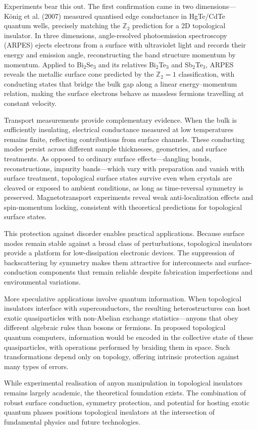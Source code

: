 Experiments bear this out. The first confirmation came in two dimensions—König et al. (2007) measured quantised edge conductance in HgTe/CdTe quantum wells, precisely matching the $\mathbb{Z}_2$ prediction for a 2D topological insulator. In three dimensions, angle-resolved photoemission spectroscopy (ARPES) ejects electrons from a surface with ultraviolet light and records their energy and emission angle, reconstructing the band structure momentum by momentum. Applied to Bi\(_2\)Se\(_3\) and its relatives Bi\(_2\)Te\(_3\) and Sb\(_2\)Te\(_3\), ARPES reveals the metallic surface cone predicted by the $\mathbb{Z}_2 = 1$ classification, with conducting states that bridge the bulk gap along a linear energy–momentum relation, making the surface electrons behave as massless fermions travelling at constant velocity.

Transport measurements provide complementary evidence. When the bulk is sufficiently insulating, electrical conductance measured at low temperatures remains finite, reflecting contributions from surface channels. These conducting modes persist across different sample thicknesses, geometries, and surface treatments. As opposed to ordinary surface effects—dangling bonds, reconstructions, impurity bands—which vary with preparation and vanish with surface treatment, topological surface states survive even when crystals are cleaved or exposed to ambient conditions, as long as time-reversal symmetry is preserved. Magnetotransport experiments reveal weak anti-localization effects and spin-momentum locking, consistent with theoretical predictions for topological surface states.

This protection against disorder enables practical applications. Because surface modes remain stable against a broad class of perturbations, topological insulators provide a platform for low-dissipation electronic devices. The suppression of backscattering by symmetry makes them attractive for interconnects and surface-conduction components that remain reliable despite fabrication imperfections and environmental variations.

More speculative applications involve quantum information. When topological insulators interface with superconductors, the resulting heterostructures can host exotic quasiparticles with non-Abelian exchange statistics—anyons that obey different algebraic rules than bosons or fermions. In proposed topological quantum computers, information would be encoded in the collective state of these quasiparticles, with operations performed by braiding them in space. Such transformations depend only on topology, offering intrinsic protection against many types of errors.

While experimental realisation of anyon manipulation in topological insulators remains largely academic, the theoretical foundation exists. The combination of robust surface conduction, symmetry protection, and potential for hosting exotic quantum phases positions topological insulators at the intersection of fundamental physics and future technologies.
